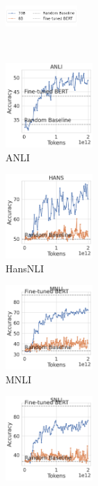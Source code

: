\begin{figure}[t]
    \begin{subfigure}[b]{\textwidth}
        \includegraphics[width=0.3\textwidth]{figures/training_legend}
        \vspace{-2mm}
    \end{subfigure}\\
    \begin{subfigure}[b]{0.20\textwidth}
    \centering
    \includegraphics[height=3.2cm]{figures/anli_intermediate}
    \caption{ANLI}
    \end{subfigure}
    \label{fig:anli_int}
    \begin{subfigure}[b]{0.19\textwidth}
    \centering
    \includegraphics[height=3.2cm, trim=11mm 0 0 0, clip]{figures/hansnli_intermediate}
    \caption{HansNLI}
    \label{fig:hansnli_int}
    \end{subfigure}
    \begin{subfigure}[b]{0.19\textwidth}
    \centering
    \includegraphics[height=3.2cm, trim=11mm 0 0 0, clip]{figures/mnli_matched_intermediate}
    \caption{MNLI}
    \label{fig:mnli_int}
    \end{subfigure}
    \begin{subfigure}[b]{0.19\textwidth}
    \centering
    \includegraphics[height=3.2cm, trim=11mm 0 0 0, clip]{figures/snli_intermediate}

\end{subfigure}
\end{figure}
